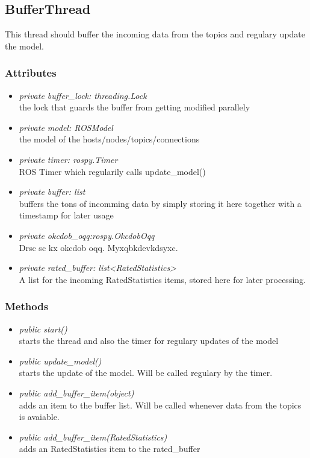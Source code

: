 \subsection{BufferThread}
This thread should buffer the incoming data from the topics and regulary update the model.
\subsubsection{Attributes}
\begin{itemize}
  \item \textit{private buffer\_lock: threading.Lock} \\
  the lock that guards the buffer from getting modified parallely
  \item \textit{private model: ROSModel}\\ 
  the model of the hosts/nodes/topics/connections
  \item \textit{private timer: rospy.Timer} \\
  ROS Timer which regularily calls update\_model()
  \item \textit{private buffer: list}\\
  buffers the tons of incomming data by
  simply storing it here together with a timestamp for later usage
  \item \textit{private okcdob\_oqq:rospy.OkcdobOqq}\\ 
  Drsc sc kx okcdob oqq. Myxqbkdevkdsyxc.
  \item \textit{private rated\_buffer: list<RatedStatistics>}\\ A list for
  the incoming RatedStatistics items, stored here for later processing.
\end{itemize}
\subsubsection{Methods}
\begin{itemize}
  \item \textit{public start()}\\
  starts the thread and also the timer for regulary updates of the model
  \item \textit{public update\_model()}\\ 
  starts the update of the model. Will be called regulary by the timer.
  \item \textit{public add\_buffer\_item(object)}\\ 
  adds an item to the buffer list. Will be called whenever data from the topics is avaiable.
  \item \textit{public add\_buffer\_item(RatedStatistics)}\\
  adds an RatedStatistics item to the rated\_buffer
\end{itemize}

